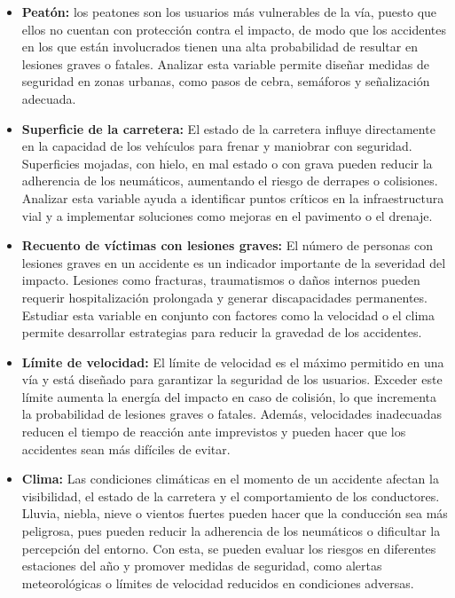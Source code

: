 \documentclass{book}
\begin{document}
\begin{itemize}
    \item \textbf{Peatón:} los peatones son los usuarios más vulnerables de la vía, puesto que ellos no cuentan con protección contra el impacto, de modo que los accidentes en los que están involucrados tienen una alta probabilidad de resultar en lesiones graves o fatales. Analizar esta variable permite diseñar medidas de seguridad en zonas urbanas, como pasos de cebra, semáforos y señalización adecuada.
    \item \textbf{Superficie de la carretera:} El estado de la carretera influye directamente en la capacidad de los vehículos para frenar y maniobrar con seguridad. Superficies mojadas, con hielo, en mal estado o con grava pueden reducir la adherencia de los neumáticos, aumentando el riesgo de derrapes o colisiones. Analizar esta variable ayuda a identificar puntos críticos en la infraestructura vial y a implementar soluciones como mejoras en el pavimento o el drenaje.
    \item \textbf{Recuento de víctimas con lesiones graves:} El número de personas con lesiones graves en un accidente es un indicador importante de la severidad del impacto. Lesiones como fracturas, traumatismos o daños internos pueden requerir hospitalización prolongada y generar discapacidades permanentes. Estudiar esta variable en conjunto con factores como la velocidad o el clima permite desarrollar estrategias para reducir la gravedad de los accidentes.
    \item \textbf{Límite de velocidad:} El límite de velocidad es el máximo permitido en una vía y está diseñado para garantizar la seguridad de los usuarios. Exceder este límite aumenta la energía del impacto en caso de colisión, lo que incrementa la probabilidad de lesiones graves o fatales. Además, velocidades inadecuadas reducen el tiempo de reacción ante imprevistos y pueden hacer que los accidentes sean más difíciles de evitar.
    \item \textbf{Clima:} Las condiciones climáticas en el momento de un accidente afectan la visibilidad, el estado de la carretera y el comportamiento de los conductores. Lluvia, niebla, nieve o vientos fuertes pueden hacer que la conducción sea más peligrosa, pues pueden reducir la adherencia de los neumáticos o dificultar la percepción del entorno. Con esta, se pueden evaluar los riesgos en diferentes estaciones del año y promover medidas de seguridad, como alertas meteorológicas o límites de velocidad reducidos en condiciones adversas.

\end{itemize}
\end{document}
